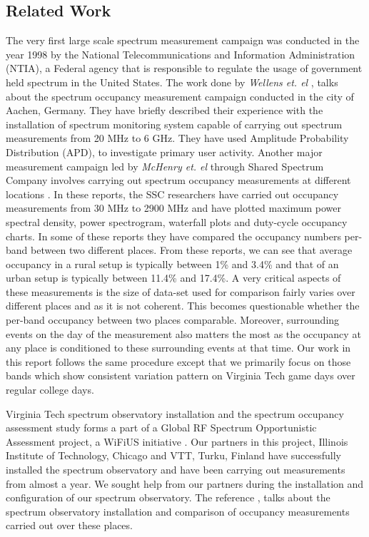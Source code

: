 \documentclass[12pt,sts]{report}
\begin{document}
\pagebreak

\subsection{Related Work}

The very first large scale spectrum measurement campaign was conducted in the year 1998 \cite{750342} by the National Telecommunications and Information Administration (NTIA), a Federal agency that is responsible to regulate the usage of government held spectrum in the United States. The work done by \textit{Wellens et. el} \cite{4549835}, talks about the spectrum occupancy measurement campaign conducted in the city of Aachen, Germany. They have briefly described their experience with the installation of spectrum monitoring system capable of carrying out spectrum measurements from 20 MHz to 6 GHz. They have used Amplitude Probability Distribution (APD), to investigate primary user activity. Another major measurement campaign led by \textit{McHenry et. el} \cite{McHenry:2006:CSO:1234388.1234389} through Shared Spectrum Company involves carrying out spectrum occupancy measurements at different locations \cite{SSCSpecReports}. In these reports, the SSC researchers have carried out occupancy measurements from 30 MHz to 2900 MHz and have plotted maximum power spectral density, power spectrogram, waterfall plots and duty-cycle occupancy charts.  In some of these reports they have compared the occupancy numbers per-band between two different places. From these reports, we can see that average occupancy in a rural setup is typically between 1\% and 3.4\% and that of an urban setup is typically between 11.4\% and 17.4\%. A very critical aspects of these measurements is the size of data-set used for comparison fairly varies over different places and as it is not coherent. This becomes questionable whether the per-band occupancy between two places comparable. Moreover, surrounding events on the day of the measurement also matters the most as the occupancy at any place is conditioned to these surrounding events at that time. Our work in this report follows the same procedure except that we primarily focus on those bands which show consistent variation pattern on Virginia Tech game days over regular college days. 

Virginia Tech spectrum observatory installation and the spectrum occupancy assessment study forms a part of a Global RF Spectrum Opportunistic Assessment project, a WiFiUS initiative \cite{HAGER_GRANT}. Our partners in this project, Illinois Institute of Technology, Chicago and VTT, Turku, Finland have successfully installed the spectrum observatory and have been carrying out measurements from almost a year. We sought help from our partners during the installation and configuration of our spectrum observatory. The reference \cite{6849666}, talks about the spectrum observatory installation and comparison of occupancy measurements carried out over these places.
\end{document}
